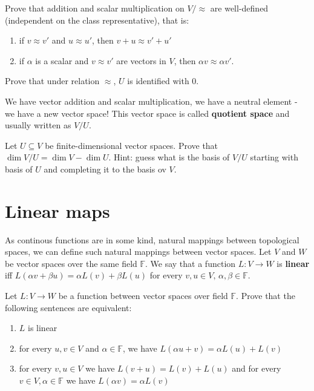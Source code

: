 \begin{prob}
  Prove that addition and scalar multiplication on $V/\approx$ are well-defined (independent on the class representative), that is:
  \begin{enumerate}
    \item if $v\approx v'$ and $u\approx u'$, then $v+u\approx v'+u'$
    \item if $\alpha$ is a scalar and $v\approx v'$ are vectors in $V$, then $\alpha v\approx \alpha v'$.
  \end{enumerate}
\end{prob}

\begin{prob}
  Prove that under relation $\approx$, $U$ is identified with 0.
\end{prob}

We have vector addition and scalar multiplication, we have a neutral element - we have a new vector space! This vector space is called \textbf{quotient space} and usually written as
$V/U$.

\begin{prob}
  Let $U\subseteq V$ be finite-dimensional vector spaces. Prove that $\dim V/U=\dim V - \dim U$. Hint: guess what is the basis of $V/U$ starting with basis of $U$ and completing
  it to the basis ov $V$.
\end{prob}

\section{Linear maps}
As continous functions are in some kind, natural mappings between topological spaces, we can define such natural mappings between vector spaces. Let $V$ and $W$ be vector spaces over
the same field $\mathbb F$. We say that a function $L:V\to W$ is \textbf{linear} iff $L(\alpha v + \beta u)=\alpha L(v) + \beta L(u)$ for every $v,u\in V,\, \alpha,\beta\in \mathbb F$.

\begin{prob}
  Let $L:V\to W$ be a function between vector spaces over field $\mathbb F$. Prove that the following sentences are equivalent:
  \begin{enumerate}
    \item $L$ is linear
    \item for every $u,v\in V$ and $\alpha\in \mathbb F$, we have $L(\alpha u+v)=\alpha L(u)+L(v)$
    \item for every $v,u\in V$ we have $L(v+u)=L(v)+L(u)$ and for every $v\in V, \alpha\in \mathbb F$ we have $L(\alpha v) = \alpha L(v)$
  \end{enumerate}
\end{prob}

